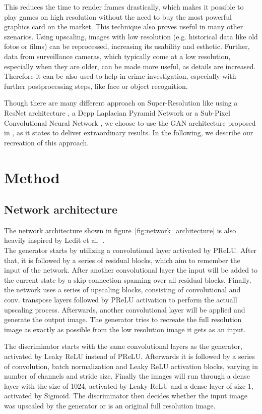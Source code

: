 \documentclass[11pt,twocolumn,twoside,paper=a4]{IEEEtran}
\begin{document}
This reduces the time to render frames drastically, which makes it possible to play games on high resolution without the need to buy the most powerful graphics card on the market. 
This technique also proves useful in many other szenarios.
Using upscaling, images with low resolution (e.g. historical data like old fotos or films) can be reprocessed, increasing its usability and esthetic.
Further, data from surveillance cameras, which typically come at a low resolution, especially when they are older, can be made more useful, as details are increased. Therefore it can be also used to help in crime investigation, especially with further postprocessing steps, like face or object recognition.

Though there are many different approach on Super-Resolution like using a ResNet architecture \cite{lim2017enhanced}, a Depp Laplacian Pyramid Network \cite{lai2018fast} or a Sub-Pixel Convolutional Neural Network \cite{shi2016real}, we choose to use the GAN architecture proposed in \cite{DBLP:journals/corr/LedigTHCATTWS16}, as it states to deliver extraordinary results.
In the following, we describe our recreation of this approach.

\section{Method}
\subsection{Network architecture}
The network architecture shown in figure~\ref{fig:network_architecture} is also heavily inspired by Ledit et al.~\cite{DBLP:journals/corr/LedigTHCATTWS16}.\\
The generator starts by utilizing a convolutional layer activated by PReLU. 
After that, it is followed by a series of residual blocks, 
which aim to remember the input of the network. 
After another convolutional layer the input will be added to the current state by a skip connection spanning over all residual blocks. 
Finally, the network uses a series of upscaling blocks, consisting of convolutional and conv. transpose layers followed by PReLU activation to perform the actuall upscaling process. 
Afterwards, another convolutional layer will be applied and generate the output image. The generator tries to recreate the full resolution image as exactly as possible from the low resolution image it gets as an input.

The discriminator starts with the same convolutional layers as the generator, activated by Leaky ReLU instead of PReLU. 
Afterwards it is followed by a series of convolution, batch normalization and Leaky ReLU activation blocks, varying in number of channels and stride size. 
Finally the images will run through a dense layer with the size of 1024, activated by Leaky ReLU and a dense layer of size 1, activated by Sigmoid. 
The discriminator then decides whether the input image was upscaled by the generator or is an original full resolution image.
\end{document}
